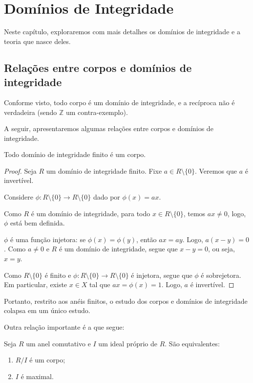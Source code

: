 \chapter{Domínios de Integridade}
Neste capítulo, exploraremos com mais detalhes os domínios de integridade e a teoria que nasce deles.

\section{Relações entre corpos e domínios de integridade}
Conforme visto, todo corpo é um domínio de integridade, e a recíproca não é verdadeira (sendo $\mathbb Z$ um contra-exemplo).

A seguir, apresentaremos algumas relações entre corpos e domínios de integridade.

\begin{prop}
Todo domínio de integridade finito é um corpo.
\end{prop}
\begin{proof}
    Seja $R$ um domínio de integridade finito.
    Fixe $a \in R\setminus\{0\}$.
    Veremos que $a$ é invertível.

    Considere $\phi:R\setminus\{0\}\rightarrow R\setminus \{0\}$ dado por $\phi(x)=ax$.

    Como $R$ é um domínio de integridade, para todo $x \in R\setminus \{0\}$, temos $ax \neq 0$, logo, $\phi$ está bem definida.

    $\phi$ é uma função injetora: se $\phi(x)=\phi(y)$, então $ax=ay$.
    Logo, $a(x-y)=0$.
    Como $a\neq 0$ e $R$ é um domínio de integridade, segue que $x-y=0$, ou seja, $x=y$.

    Como $R\setminus\{0\}$ é finito e $\phi:R\setminus\{0\}\rightarrow R\setminus \{0\}$ é injetora, segue que $\phi$ é sobrejetora.
    Em particular, existe $x \in X$ tal que $ax=\phi(x)=1$.
    Logo, $a$ é invertível.
\end{proof}

Portanto, restrito aos anéis finitos, o estudo dos corpos e domínios de integridade colapsa em um único estudo.

Outra relação importante é a que segue:

\begin{prop}
Seja $R$ um anel comutativo e $I$ um ideal próprio de $R$. São equivalentes:

\begin{enumerate}[label=(\roman*)]
    \item $R/I$ é um corpo;
    \item $I$ é maximal.
\end{enumerate}
\end{prop}

